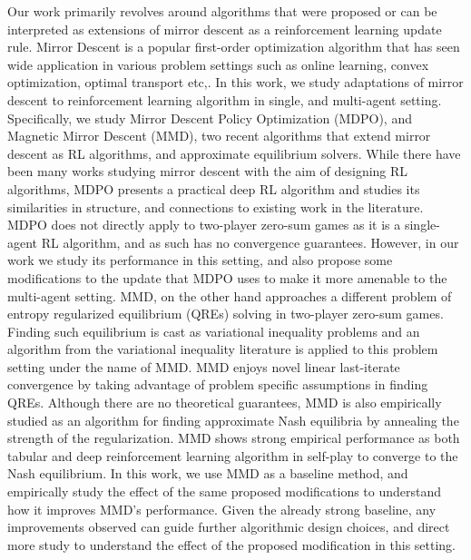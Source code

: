 Our work primarily revolves around algorithms that were proposed or can be interpreted as
extensions of mirror descent as a reinforcement learning update rule.
Mirror Descent is a popular first-order optimization algorithm that has seen wide application in
various problem settings such as online learning, convex optimization, optimal transport etc,.
In this work, we study adaptations of mirror descent to reinforcement learning algorithm in single,
and multi-agent setting.
Specifically, we study Mirror Descent Policy Optimization (MDPO), and Magnetic Mirror Descent
(MMD), two recent algorithms that extend mirror descent as RL algorithms, and approximate
equilibrium solvers.
While there have been many works studying mirror descent with the aim of designing RL algorithms,
MDPO presents a practical deep RL algorithm and studies its similarities in structure, and
connections to existing work in the literature.
MDPO does not directly apply to two-player zero-sum games as it is a single-agent RL algorithm, and
as such has no convergence guarantees.
However, in our work we study its performance in this setting, and also propose some modifications
to the update that MDPO uses to make it more amenable to the multi-agent setting.
MMD, on the other hand approaches a different problem of entropy regularized equilibrium (QREs)
solving in two-player zero-sum games.
Finding such equilibrium is cast as variational inequality problems and an algorithm from the
variational inequality literature is applied to this problem setting under the name of MMD.
MMD enjoys novel linear last-iterate convergence by taking advantage of problem specific
assumptions in finding QREs.
Although there are no theoretical guarantees, MMD is also empirically studied as an algorithm for
finding approximate Nash equilibria by annealing the strength of the regularization.
MMD shows strong empirical performance as both tabular and deep reinforcement learning algorithm in
self-play to converge to the Nash equilibrium.
In this work, we use MMD as a baseline method, and empirically study the effect of the same
proposed modifications to understand how it improves MMD's performance.
Given the already strong baseline, any improvements observed can guide further algorithmic design
choices, and direct more study to understand the effect of the proposed modification in this
setting.

